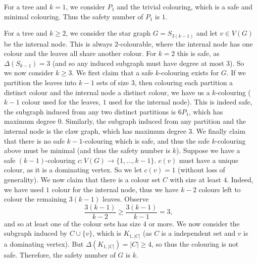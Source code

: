 \begin{solution}
    \begin{center}
    \end{center}

    For a tree and $k = 1$, we consider $P_1$ and the trivial colouring, which is a safe and minimal colouring. Thus the safety number of $P_1$ is $1$. 

    For a tree and $k \geq 2$, we consider the star graph $G = S_{3(k-1)}$ and let $v \in V(G)$ be the internal node. This is always $2$-colourable, where the internal node has one colour and the leaves all share another colour. For $k = 2$ this is safe, as $\Delta(S_{k-1}) = 3$ (and so any induced subgraph must have degree at most $3$). So we now consider $k \geq 3$. We first claim that a safe $k$-colouring exists for $G$. If we partition the leaves into $k-1$ sets of size $3$, then colouring each partition a distinct colour and the internal node a distinct colour, we have us a $k$-colouring ($k-1$ colour used for the leaves, $1$ used for the internal node). This is indeed safe, the subgraph induced from any two distinct partitions is $6P_1$, which has maximum degree $0$. Similarly, the subgraph induced from any partition and the internal node is the claw graph, which has maximum degree $3$. We finally claim that there is no safe $k-1$-colouring which is safe, and thus the safe $k$-colouring above must be minimal (and thus the safety number is $k$). Suppose we have a safe $(k-1)$-colouring $c: V(G) \to \{1, \ldots, k-1\}$. $c(v)$ must have a unique colour, as it is a dominating vertex. So we let $c(v) = 1$ (without loss of generality). We now claim that there is a colour set $C$ with size at least $4$. Indeed, we have used $1$ colour for the internal node, thus we have $k-2$ colours left to colour the remaining $3(k-1)$ leaves. Observe
    \[ \frac{3(k-1)}{k-2} \geq \frac{3(k-1)}{k-1} = 3, \]
    and so at least one of the colour sets has size $4$ or more. We now consider the subgraph induced by $C \cup \{v\}$, which is $K_{1, \lvert C \rvert}$ (as $C$ is a independent set and $v$ is a dominating vertex). But $\Delta(K_{1, \lvert C \rvert}) = \lvert C \rvert \geq 4$, so thus the colouring is not safe. Therefore, the safety number of $G$ is $k$.  
\end{solution}
